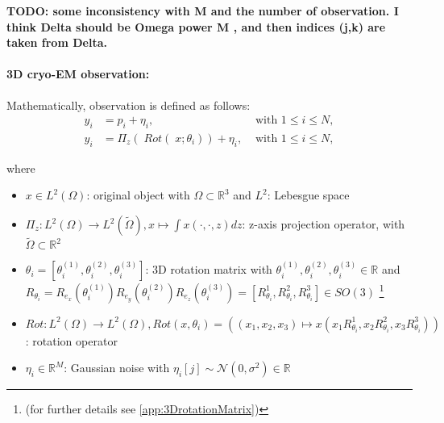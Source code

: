 \textbf{TODO: some inconsistency with M and the number of observation. 
I think Delta should be Omega power M , and then indices (j,k) are taken from Delta.}

\paragraph{3D cryo-EM observation:}
Mathematically, observation is defined as follows:
\begin{equation}
    \label{eq:cryoEmSimple}
    \begin{aligned}
        y_i &= p_i + \eta_i, &\text{ with } 1 \leq i \leq N,\\
        y_i &= \Pi_z  (\; Rot (\;x; \theta_i )) + \eta_i, &\text{ with } 1 \leq i \leq N,    
    \end{aligned}
\end{equation}

where 
\begin{itemize}
    \item $x \in L^2(\Omega)$: original object with $\Omega \subset \mathbb{R}^3 $ and $L^2$: Lebesgue space
    \item $\Pi_z : L^2(\Omega) \to L^2(\tilde{\Omega}), x \mapsto  \int x(\cdot,\cdot,z) dz$: z-axis projection operator,
          with $\tilde{\Omega} \subset \mathbb{R}^2$
    \item $\theta_i = [\theta_i^{(1)}, \theta_i^{(2)}, \theta_i^{(3)} ] $: 3D rotation matrix with $ \theta_i^{(1)}, \theta_i^{(2)}, \theta_i^{(3)} \in \mathbb{R}$ and \\
          $R_{\theta_i} =  R_{e_x} (\theta_i^{(1)}) R_{e_y} (\theta_i^{(2)}) R_{e_z} (\theta_i^{(3)}) = [R^1_{\theta_i}, R^2_{\theta_i}, R^3_{\theta_i}] \in SO(3)$ 
          \footnote{(for further details see \ref{app:3DrotationMatrix})}
          
    \item $\textit{Rot} : L^2(\Omega) \to L^2(\Omega), \textit{Rot}(x, \theta_i) = \left((x_1,x_2,x_3) \mapsto x( x_1R^1_{\theta_i}, x_2R^2_{\theta_i}, x_3R^3_{\theta_i})\right)$: rotation operator
    \item $\eta_i \in \mathbb{R}^M$: Gaussian noise with $\eta_i[j] \sim \mathcal{N}(0,\sigma^2) \in \mathbb{R}$
\end{itemize}



